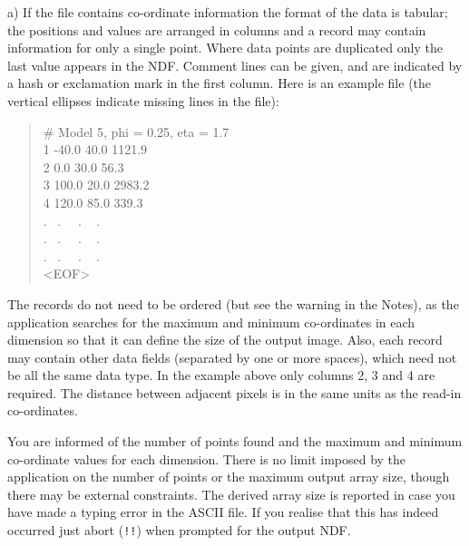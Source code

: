 {{{      a)  If the file contains co-ordinate information the format
      of the data is tabular; the positions and values are arranged in
      columns and a record may contain information for only a single
      point.  Where data points are duplicated only the last value
      appears in the NDF.  Comment lines can be given, and are
      indicated by a hash or exclamation mark in the first column.
      Here is an example file (the vertical ellipses indicate missing
      lines in the file):
{\tt \begin{verse}
          \# Model 5, phi = 0.25,  eta = 1.7 \\
          1 -40.0   40.0   1121.9 \\
          2  0.0   30.0     56.3 \\
          3 100.0   20.0   2983.2 \\
          4 120.0   85.0    339.3 \\
          . ~. ~~. ~ .   \\
          . ~. ~~. ~ .   \\
          . ~. ~~. ~ .   \\
          <EOF>
\end{verse}}

      The records do not need to be ordered (but see the warning in the
      Notes), as the application searches for the maximum and minimum
      co-ordinates in each dimension so that it can define the size of
      the output image.  Also, each record may contain other data
      fields (separated by one or more spaces), which need not be all
      the same data type.  In the example above only columns 2, 3 and 4
      are required.  The distance between adjacent pixels is in the
      same units as the read-in co-ordinates.

      You are informed of the number of points found and the maximum
      and minimum co-ordinate values for each dimension.  There is no
      limit imposed by the application on the number of points or the
      maximum output array size, though there may be external
      constraints.  The derived array size is reported in case you have
      made a typing error in the ASCII file.  If you realise that this
      has indeed occurred just abort ({\tt !!}) when prompted for the output
      NDF.

}}}
